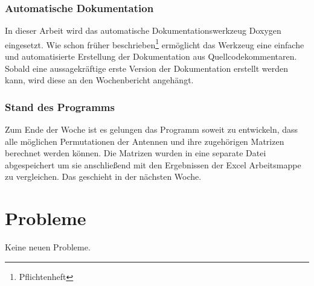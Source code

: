 \documentclass[a4paper,12pt,fleqn]{article}
\begin{document}
\subsubsection{Automatische Dokumentation}
%
In dieser Arbeit wird das automatische Dokumentationswerkzeug Doxygen \cite{Dox1} eingesetzt. Wie schon früher beschrieben\footnote{Pflichtenheft} ermöglicht das Werkzeug eine einfache und automatisierte Erstellung der Dokumentation aus Quellcodekommentaren.\\
Sobald eine aussagekräftige erste Version der Dokumentation erstellt werden kann, wird diese an den Wochenbericht angehängt.
%
\subsubsection{Stand des Programms}
%
Zum Ende der Woche ist es gelungen das Programm soweit zu entwickeln, dass alle möglichen Permutationen der Antennen und ihre zugehörigen Matrizen berechnet werden können. Die Matrizen wurden in eine separate Datei abgespeichert um sie anschließend mit den Ergebnissen der Excel Arbeitsmappe zu vergleichen. Das geschieht in der nächsten Woche.

\section{Probleme}
\label{Problems}
Keine neuen Probleme.
%


\newpage


\end{document}
